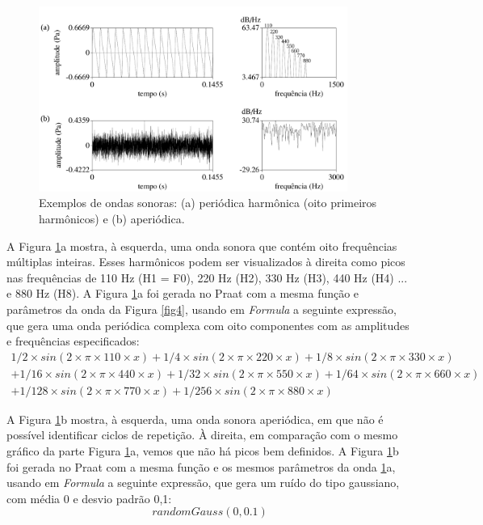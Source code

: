 \documentclass[portuguese]{textolivre}
\begin{document}
\begin{figure}[H]
 \centering
 \includegraphics[width=0.9\textwidth]{Fig5.pdf}
 \caption{Exemplos de ondas sonoras: (a) periódica harmônica (oito primeiros harmônicos) e (b) aperiódica.}
 \label{fig5}
\end{figure}

A Figura \ref{fig5}a mostra, à esquerda, uma onda sonora que contém oito frequências múltiplas inteiras. Esses harmônicos podem ser visualizados à direita como picos nas frequências de 110 Hz (H1 = F0), 220 Hz (H2), 330 Hz (H3), 440 Hz (H4) ... e 880 Hz (H8). A Figura \ref{fig5}a foi gerada no Praat com a mesma função e parâmetros da onda da Figura \ref{fig4}, usando em \textit{Formula} a seguinte expressão, que gera uma onda periódica complexa com oito componentes com as amplitudes e frequências especificados: 
\begin{align*}
1/2 \times sin(2 \times \pi \times 110 \times x) + 
1/4 \times sin(2 \times \pi \times 220\times x) + 
1/8 \times sin(2 \times \pi \times 330 \times x) \\ + 
1/16 \times sin(2 \times \pi \times 440 \times x) + 
1/32 \times sin(2 \times \pi \times 550\times x) + 
1/64 \times sin(2 \times \pi \times 660 \times x) \\ + 
1/128 \times sin(2 \times \pi \times 770 \times x) +
1/256 \times sin(2 \times \pi \times 880 \times x)
\end{align*}

A Figura \ref{fig5}b mostra, à esquerda, uma onda sonora aperiódica, em que não é possível identificar ciclos de repetição. À direita, em comparação com o mesmo gráfico da parte Figura \ref{fig5}a, vemos que não há picos bem definidos. A Figura \ref{fig5}b foi gerada no Praat com a mesma função e os mesmos parâmetros da onda \ref{fig5}a, usando em \textit{Formula} a seguinte expressão, que gera um ruído do tipo gaussiano, com média 0 e desvio padrão 0,1: \[randomGauss(0,0.1)\] 
\end{document}
